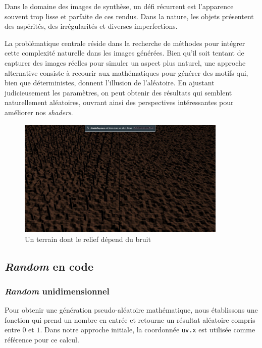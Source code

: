 Dans le domaine des images de synthèse, un défi récurrent est l'apparence souvent trop lisse et parfaite de ces rendus. Dans la nature, les objets présentent des aspérités, des irrégularités et diverses imperfections.

La problématique centrale réside dans la recherche de méthodes pour intégrer cette complexité naturelle dans les images générées. Bien qu'il soit tentant de capturer des images réelles pour simuler un aspect plus naturel, une approche alternative consiste à recourir aux mathématiques pour générer des motifs qui, bien que déterministes, donnent l'illusion de l'aléatoire. En ajustant judicieusement les paramètres, on peut obtenir des résultats qui semblent naturellement aléatoires, ouvrant ainsi des perspectives intéressantes pour améliorer nos \textit{shaders}.

\begin{figure}[h]
    \begin{center}
    \includegraphics[width=10cm]{images/shaders/shaderatelier_13.jpg}
    \end{center}
    \caption{Un terrain dont le relief dépend du bruit}
\end{figure}



\subsection*{\textit{Random} en code}
\subsubsection*{\textit{Random} unidimensionnel}

Pour obtenir une génération pseudo-aléatoire mathématique, nous établissons une fonction qui prend un nombre en entrée et retourne un résultat aléatoire compris entre $0$ et $1$. Dans notre approche initiale, la coordonnée \lstinline{uv.x} est utilisée comme référence pour ce calcul.

